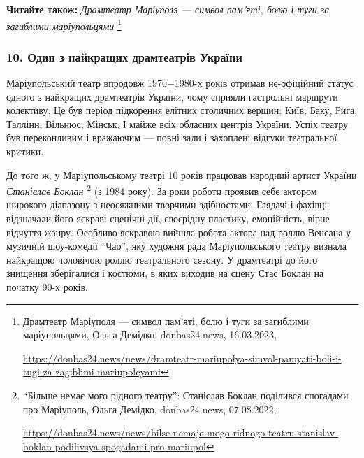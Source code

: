 \textbf{Читайте також:} \emph{Драмтеатр Маріуполя — символ пам'яті, болю і туги за загиблими маріупольцями}%
\footnote{Драмтеатр Маріуполя — символ пам'яті, болю і туги за загиблими маріупольцями, Ольга Демідко, donbas24.news, 16.03.2023, \par%
\url{https://donbas24.news/news/dramteatr-mariupolya-simvol-pamyati-boli-i-tugi-za-zagiblimi-mariupolcyami}%
}


\subsubsection{10. Один з найкращих драмтеатрів України}

Маріупольський театр впродовж 1970−1980-х років отримав не\hyp{}офіційний статус
одного з найкращих драмтеатрів України, чому сприяли гастрольні маршрути
колективу. Це був період підкорення елітних столичних вершин: Київ, Баку, Рига,
Таллінн, Вільнюс, Мінськ. І майже всіх обласних центрів України. Успіх театру
був переконливим і вражаючим — повні зали і захоплені відгуки театральної
критики. 


До того ж, у Маріупольському театрі 10 років працював народний артист
України \href{https://donbas24.news/news/bilse-nemaje-mogo-ridnogo-teatru-stanislav-boklan-podilivsya-spogadami-pro-mariupol}{%
\emph{Станіслав Боклан}}%
\footnote{\enquote{Більше немає мого рідного театру}: Станіслав Боклан поділився спогадами про Маріуполь, Ольга Демідко, %
donbas24.news, 07.08.2022, \par%
\url{https://donbas24.news/news/bilse-nemaje-mogo-ridnogo-teatru-stanislav-boklan-podilivsya-spogadami-pro-mariupol}%
}
(з 1984 року). За роки роботи проявив себе актором
широкого діапазону з неосяжними творчими здібностями. Глядачі і фахівці
відзначали його яскраві сценічні дії, своєрідну пластику, емоційність, вірне
відчуття жанру. Особливо яскравою вийшла робота актора над роллю Венсана у
музичній шоу-комедії \enquote{Чао}, яку художня рада Маріупольського театру визнала
найкращою чоловічою роллю театрального сезону. У драмтеатрі до його знищення
зберігалися і костюми, в яких виходив на сцену Стас Боклан на початку 90-х
років.

